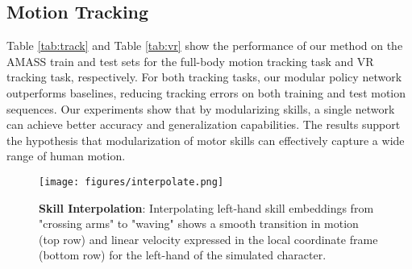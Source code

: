 \subsection{Motion Tracking}

Table \ref{tab:track} and Table \ref{tab:vr} show the performance of our method on the AMASS train and test sets for the full-body motion tracking task and VR tracking task, respectively. For both tracking tasks, our modular policy network outperforms baselines, reducing tracking errors on both training and test motion sequences. Our experiments show that by modularizing skills, a single network can achieve better accuracy and generalization capabilities. The results support the hypothesis that modularization of motor skills can effectively capture a wide range of human motion.

\begin{figure*}[h]
    \centering
    \texttt{[image: figures/interpolate.png]}
    \caption{\textbf{Skill Interpolation}: Interpolating left-hand skill embeddings from "crossing arms" to "waving" shows a smooth transition in motion (top row) and linear velocity expressed in the local coordinate frame (bottom row) for the left-hand of the simulated character.}
    \label{fig:interpolate}
\end{figure*}


